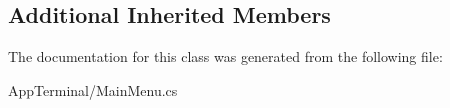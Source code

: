 \subsection*{Additional Inherited Members}


The documentation for this class was generated from the following file\-:\begin{DoxyCompactItemize}
\item 
App\-Terminal/Main\-Menu.\-cs\end{DoxyCompactItemize}
